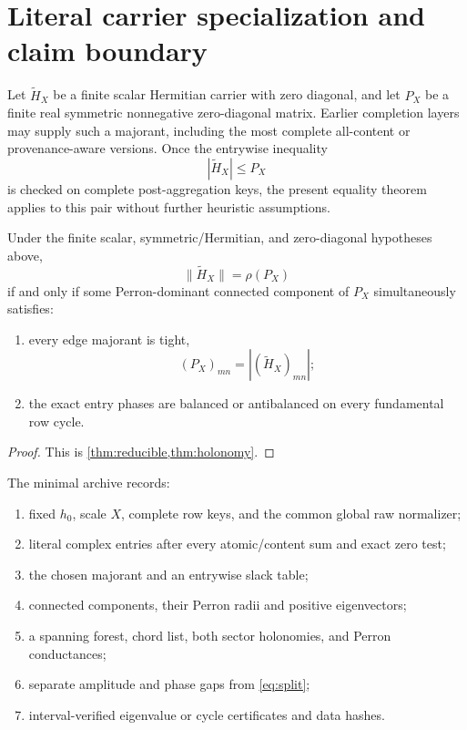\section{Literal carrier specialization and claim boundary}
\label{sec:boundary}

Let \(\widetilde H_X\) be a finite scalar Hermitian carrier with zero
diagonal, and let \(P_X\) be a finite real symmetric nonnegative
zero-diagonal matrix.  Earlier completion layers may supply such a
majorant, including the most complete all-content or provenance-aware
versions.  Once the entrywise inequality
\[
 |\widetilde H_X|\le P_X
\]
is checked on complete post-aggregation keys, the present equality
theorem applies to this pair without further heuristic assumptions.

\begin{proposition}\label{prop:literal}
Under the finite scalar, symmetric/Hermitian, and zero-diagonal
hypotheses above,
\[
 \|\widetilde H_X\|=\rho(P_X)
\]
if and only if some Perron-dominant connected component of \(P_X\)
simultaneously satisfies:
\begin{enumerate}[label=(\roman*),leftmargin=2.4em]
\item every edge majorant is tight,
\[
 (P_X)_{mn}=|(\widetilde H_X)_{mn}|;
\]
\item the exact entry phases are balanced or antibalanced on every
fundamental row cycle.
\end{enumerate}
\end{proposition}

\begin{proof}
This is \cref{thm:reducible,thm:holonomy}.
\end{proof}

The minimal archive records:
\begin{enumerate}[label=(A\arabic*),leftmargin=2.7em]
\item fixed \(h_0\), scale \(X\), complete row keys, and the common
global raw normalizer;
\item literal complex entries after every atomic/content sum and exact
zero test;
\item the chosen majorant and an entrywise slack table;
\item connected components, their Perron radii and positive
eigenvectors;
\item a spanning forest, chord list, both sector holonomies, and
Perron conductances;
\item separate amplitude and phase gaps from \eqref{eq:split};
\item interval-verified eigenvalue or cycle certificates and data
hashes.
\end{enumerate}

